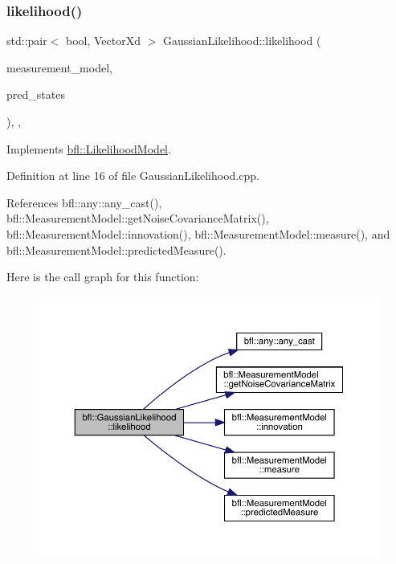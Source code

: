 \subsubsection{\texorpdfstring{likelihood()}{likelihood()}}
{\footnotesize\ttfamily std\+::pair$<$ bool, Vector\+Xd $>$ Gaussian\+Likelihood\+::likelihood (\begin{DoxyParamCaption}\item[{const \mbox{\hyperlink{classbfl_1_1MeasurementModel}{Measurement\+Model}} \&}]{measurement\+\_\+model,  }\item[{const Eigen\+::\+Ref$<$ const Eigen\+::\+Matrix\+Xd $>$ \&}]{pred\+\_\+states }\end{DoxyParamCaption})\hspace{0.3cm}{\ttfamily [override]}, {\ttfamily [protected]}, {\ttfamily [virtual]}}



Implements \mbox{\hyperlink{classbfl_1_1LikelihoodModel_a401a363bea9178f568ca4968f9d170b0}{bfl\+::\+Likelihood\+Model}}.



Definition at line 16 of file Gaussian\+Likelihood.\+cpp.



References bfl\+::any\+::any\+\_\+cast(), bfl\+::\+Measurement\+Model\+::get\+Noise\+Covariance\+Matrix(), bfl\+::\+Measurement\+Model\+::innovation(), bfl\+::\+Measurement\+Model\+::measure(), and bfl\+::\+Measurement\+Model\+::predicted\+Measure().

Here is the call graph for this function\+:
\nopagebreak
\begin{figure}[H]
\begin{center}
\leavevmode
\includegraphics[width=350pt]{classbfl_1_1GaussianLikelihood_a07bbe94864e1cf4ccb2232e51673575a_cgraph}
\end{center}
\end{figure}


